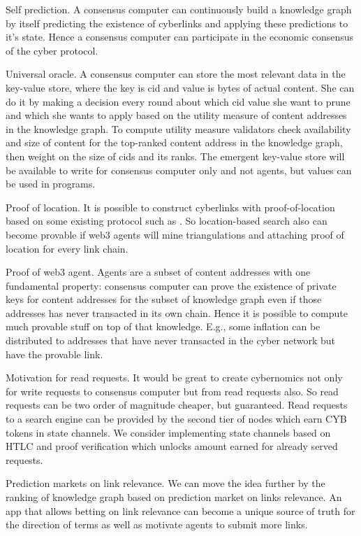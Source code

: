 \documentclass[8pt,oneside]{amsart}
\newcommand{\linkgreen}[2]{\href{#1}{\color{green}{#2}}}
\newcommand{\code}[1]{{\PlayBold #1}}
\begin{document}
\code{Self prediction}. A consensus computer can continuously build a knowledge graph by itself predicting the existence of cyberlinks and applying these predictions to it's state. Hence a consensus computer can participate in the economic consensus of the cyber protocol.

\code{Universal oracle}. A consensus computer can store the most relevant data in the key-value store, where the key is cid and value is bytes of actual content. She can do it by making a decision every round about which cid value she want to prune and which she wants to apply based on the utility measure of content addresses in the knowledge graph. To compute utility measure validators check availability and size of content for the top-ranked content address in the knowledge graph, then weight on the size of cids and its ranks. The emergent key-value store will be available to write for consensus computer only and not agents, but values can be used in programs.

\code{Proof of location}. It is possible to construct cyberlinks with proof-of-location based on some existing protocol such as \linkgreen{https://ipfs.io/ipfs/QmZYKGuLHf2h1mZrhiP2FzYsjj3tWt2LYduMCRbpgi5pKG}{Foam}. So location-based search also can become provable if web3 agents will mine triangulations and attaching proof of location for every link chain.

\code{Proof of web3 agent}. Agents are a subset of content addresses with one fundamental property: consensus computer can prove the existence of private keys for content addresses for the subset of knowledge graph even if those addresses has never transacted in its own chain. Hence it is possible to compute much provable stuff on top of that knowledge. E.g., some inflation can be distributed to addresses that have never transacted in the cyber network but have the provable link.

\code{Motivation for read requests}. It would be great to create cybernomics not only for write requests to consensus computer but from read requests also. So read requests can be two order of magnitude cheaper, but guaranteed. Read requests to a search engine can be provided by the second tier of nodes which earn CYB tokens in state channels. We consider implementing state channels based on HTLC and proof verification which unlocks amount earned for already served requests.

\code{Prediction markets on link relevance}. We can move the idea further by the ranking of knowledge graph based on prediction market on links relevance. An app that allows betting on link relevance can become a unique source of truth for the direction of terms as well as motivate agents to submit more links.
\end{document}
